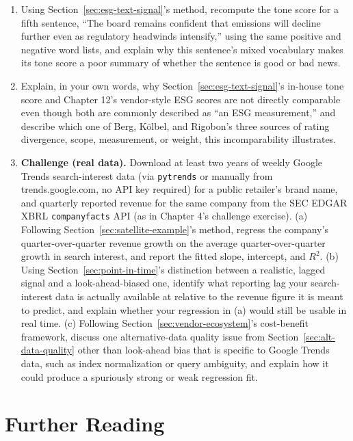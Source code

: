 \documentclass[../ai_in_finance]{subfiles}
\begin{document}
\begin{enumerate}
    \item Using Section~\ref{sec:esg-text-signal}'s method, recompute the tone score for a fifth sentence, ``The board remains confident that emissions will decline further even as regulatory headwinds intensify,'' using the same positive and negative word lists, and explain why this sentence's mixed vocabulary makes its tone score a poor summary of whether the sentence is good or bad news.
    \item Explain, in your own words, why Section~\ref{sec:esg-text-signal}'s in-house tone score and Chapter 12's vendor-style ESG scores are not directly comparable even though both are commonly described as ``an ESG measurement,'' and describe which one of Berg, Kölbel, and Rigobon's three sources of rating divergence, scope, measurement, or weight, this incomparability illustrates.
    \item \textbf{Challenge (real data).} Download at least two years of weekly Google Trends search-interest data (via \texttt{pytrends} or manually from trends.google.com, no API key required) for a public retailer's brand name, and quarterly reported revenue for the same company from the SEC EDGAR XBRL \texttt{companyfacts} API (as in Chapter 4's challenge exercise). (a) Following Section~\ref{sec:satellite-example}'s method, regress the company's quarter-over-quarter revenue growth on the average quarter-over-quarter growth in search interest, and report the fitted slope, intercept, and $R^2$. (b) Using Section~\ref{sec:point-in-time}'s distinction between a realistic, lagged signal and a look-ahead-biased one, identify what reporting lag your search-interest data is actually available at relative to the revenue figure it is meant to predict, and explain whether your regression in (a) would still be usable in real time. (c) Following Section~\ref{sec:vendor-ecosystem}'s cost-benefit framework, discuss one alternative-data quality issue from Section~\ref{sec:alt-data-quality} other than look-ahead bias that is specific to Google Trends data, such as index normalization or query ambiguity, and explain how it could produce a spuriously strong or weak regression fit.
\end{enumerate}

\section{Further Reading}
\end{document}
